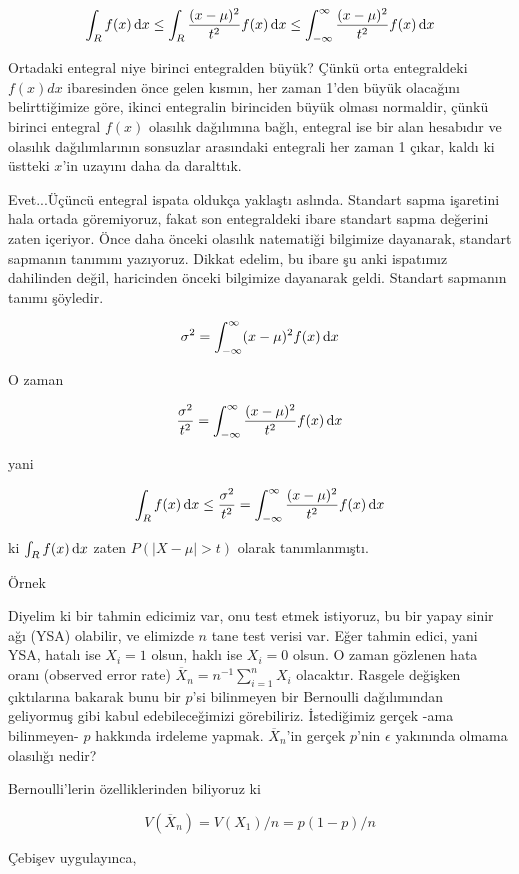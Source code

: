 \documentclass[12pt,fleqn]{article}\usepackage{../../common}
\begin{document}
$$
\int_R f(x) \,\mathrm{d} x \le \int_R \frac{(x-\mu)^2}{t^2}f(x) \,\mathrm{d} x \le
\int_{-\infty}^{\infty}\frac{(x-\mu)^2}{t^2}f(x) \,\mathrm{d} x 
$$

Ortadaki entegral niye birinci entegralden büyük? Çünkü orta entegraldeki
$f(x)dx$ ibaresinden önce gelen kısmın, her zaman 1'den büyük olacağını
belirttiğimize göre, ikinci entegralin birinciden büyük olması normaldir,
çünkü birinci entegral $f(x)$ olasılık dağılımına bağlı, entegral ise bir
alan hesabıdır ve olasılık dağılımlarının sonsuzlar arasındaki entegrali
her zaman 1 çıkar, kaldı ki üstteki $x$'in uzayını daha da daralttık.

Evet...Üçüncü entegral ispata oldukça yaklaştı aslında. Standart sapma
işaretini hala ortada göremiyoruz, fakat son entegraldeki ibare standart
sapma değerini zaten içeriyor. Önce daha önceki olasılık natematiği
bilgimize dayanarak, standart sapmanın tanımını yazıyoruz. Dikkat edelim,
bu ibare şu anki ispatımız dahilinden değil, haricinden önceki bilgimize
dayanarak geldi. Standart sapmanın tanımı şöyledir.

$$ \sigma^2 = \int_{-\infty}^{\infty} (x-\mu)^2f(x) \,\mathrm{d} x $$

O zaman

$$
\frac{\sigma^2}{t^2}
= \int_{-\infty}^{\infty}\frac{(x-\mu)^2}{t^2}f(x)\,\mathrm{d} x
$$

yani

$$
\int_R f(x) \,\mathrm{d} x \le \frac{\sigma^2}{t^2} = 
\int_{-\infty}^{\infty} \frac{(x-\mu)^2}{t^2}f(x) \,\mathrm{d} x
$$

ki $\int_R f(x) \,\mathrm{d} x$ zaten $P(|X-\mu| > t)$ olarak tanımlanmıştı. 

Örnek

Diyelim ki bir tahmin edicimiz var, onu test etmek istiyoruz, bu bir yapay
sinir ağı (YSA) olabilir, ve elimizde $n$ tane test verisi var. Eğer tahmin
edici, yani YSA, hatalı ise $X_i=1$ olsun, haklı ise $X_i=0$ olsun. O zaman
gözlenen hata oranı (observed error rate)
$\overline{X}_n = n^{-1}\sum _{i=1}^{n} X_i$ olacaktır. Rasgele değişken
çıktılarına bakarak bunu bir $p$'si bilinmeyen bir Bernoulli dağılımından
geliyormuş gibi kabul edebileceğimizi görebiliriz. İstediğimiz gerçek -ama
bilinmeyen- $p$ hakkında irdeleme yapmak. $\overline{X}_n$'in gerçek
$p$'nin $\epsilon$ yakınında olmama olasılığı nedir?

Bernoulli'lerin özelliklerinden biliyoruz ki 

$$ V(\overline{X}_n) = V(X_1) / n = p(1-p)/n$$

Çebişev uygulayınca, 
\end{document}
